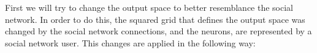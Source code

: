 First we will try to change the output space to better resemblance the social network. In order to do this, the squared grid that defines the output space was changed by the social network connections, and the neurons, are represented by a social network user. This changes are applied in the following way:
\begin{figure}[htpb]
  \centering
  \hspace*{0.5cm}

\end{figure}
